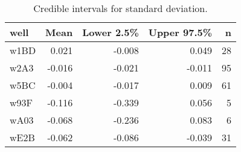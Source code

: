 \begin{table}[ht]
\centering
\begin{tabular}{lrrrr}
  \hline
well & Mean & Lower 2.5\% & Upper 97.5\% & n \\ 
  \hline
w1BD & 0.021 & -0.008 & 0.049 &   28 \\ 
  w2A3 & -0.016 & -0.021 & -0.011 &   95 \\ 
  w5BC & -0.004 & -0.017 & 0.009 &   61 \\ 
  w93F & -0.116 & -0.339 & 0.056 &    5 \\ 
  wA03 & -0.068 & -0.236 & 0.083 &    6 \\ 
  wE2B & -0.062 & -0.086 & -0.039 &   31 \\ 
   \hline
\end{tabular}
\caption{Credible intervals for standard deviation.} 
\label{tab:sd}
\end{table}
